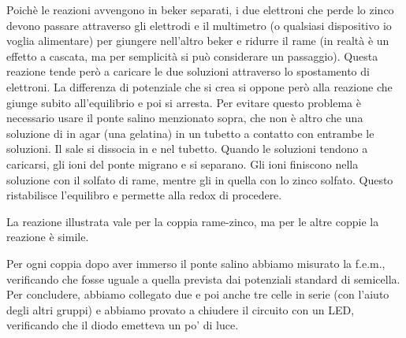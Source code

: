 Poichè le reazioni avvengono in beker separati, i due elettroni che perde lo zinco devono passare
attraverso gli elettrodi e il multimetro (o qualsiasi dispositivo io voglia alimentare)
per giungere nell'altro beker e ridurre il rame
(in realtà è un effetto a cascata, ma per semplicità si può considerare un passaggio). Questa reazione 
tende però a caricare le due soluzioni attraverso lo spostamento di elettroni. La differenza di potenziale che
si crea si oppone però alla reazione che giunge subito all'equilibrio e poi si arresta. Per evitare questo problema
è necessario usare il ponte salino menzionato sopra, che non è altro che una soluzione di  in agar (una gelatina) in un tubetto a contatto con entrambe le soluzioni. Il sale si dissocia in  e  nel tubetto.
Quando le soluzioni tendono a caricarsi, gli ioni del ponte migrano e si separano. Gli ioni  finiscono
nella soluzione con il solfato di rame, mentre gli  in quella con lo zinco solfato. Questo ristabilisce l'equilibro e permette alla redox di procedere.

La reazione illustrata vale per la coppia rame-zinco, ma per le altre coppie la reazione è simile. 

Per ogni coppia dopo aver immerso il ponte salino abbiamo misurato la f.e.m., verificando che fosse
uguale a quella prevista dai potenziali standard di semicella. Per concludere, abbiamo collegato due e poi anche tre
celle in serie (con l'aiuto degli altri gruppi) e abbiamo provato a chiudere il circuito con un LED, verificando
che il diodo emetteva un po' di luce. 
